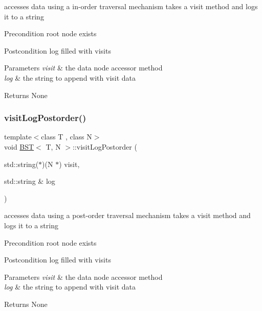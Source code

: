accesses data using a in-\/order traversal mechanism takes a visit method and logs it to a string \begin{DoxyPrecond}{Precondition}
root node exists 
\end{DoxyPrecond}
\begin{DoxyPostcond}{Postcondition}
log filled with visits 
\end{DoxyPostcond}

\begin{DoxyParams}{Parameters}
{\em visit} & the data node accessor method \\
\hline
{\em log} & the string to append with visit data \\
\hline
\end{DoxyParams}
\begin{DoxyReturn}{Returns}
None 
\end{DoxyReturn}
\mbox{\label{class_b_s_t_a831b6fdcda13b7a353e03992b9c965b7}} 
\subsubsection{\texorpdfstring{visit\+Log\+Postorder()}{visitLogPostorder()}}
{\footnotesize\ttfamily template$<$class T , class N$>$ \\
void \hyperlink{class_b_s_t}{B\+ST}$<$ T, N $>$\+::visit\+Log\+Postorder (\begin{DoxyParamCaption}\item[{std\+::string($\ast$)(N $\ast$)}]{visit,  }\item[{std\+::string \&}]{log }\end{DoxyParamCaption})}

accesses data using a post-\/order traversal mechanism takes a visit method and logs it to a string \begin{DoxyPrecond}{Precondition}
root node exists 
\end{DoxyPrecond}
\begin{DoxyPostcond}{Postcondition}
log filled with visits 
\end{DoxyPostcond}

\begin{DoxyParams}{Parameters}
{\em visit} & the data node accessor method \\
\hline
{\em log} & the string to append with visit data \\
\hline
\end{DoxyParams}
\begin{DoxyReturn}{Returns}
None 
\end{DoxyReturn}
\mbox{\label{class_b_s_t_a7ed3924d6f70e52c7a6bc1d5bddbb31d}} 
